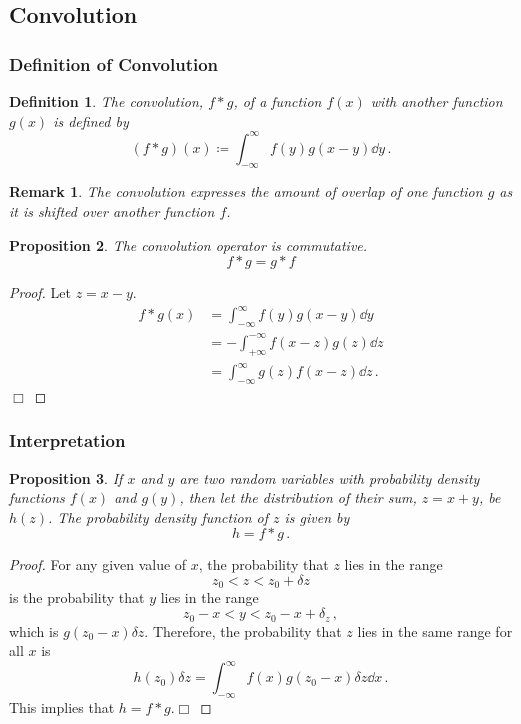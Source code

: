\documentclass{article}
\theoremstyle{plain}\theoremheaderfont{\normalfont\itshape}\theorembodyfont{\rmfamily}\theoremseparator{.}\newtheorem*{rem}{Remark}\newtheorem*{ex}{Example}\newtheorem*{proof}{Proof}\newtheorem*{altp}{Alternative proof}
\theoremstyle{plain}\theoremheaderfont{\normalfont\bfseries}\theorembodyfont{\rmfamily}\theoremseparator{.}\newtheorem{thm}{Theorem}[section]\newtheorem{lem}[thm]{Lemma}\newtheorem{prop}[thm]{Proposition}\newtheorem*{cor}{Corollary}\newtheorem{defn}[thm]{Definition}\newtheorem{clm}[thm]{Claim}\newtheorem{clminproof}{Claim}
\theoremstyle{break}\theoremheaderfont{\normalfont\itshape}\theorembodyfont{\rmfamily}\theoremseparator{.\medskip}\newtheorem*{proofskip}{Proof}\newtheorem*{exs}{Examples}\newtheorem*{rems}{Remarks}
\theoremstyle{break}\theoremheaderfont{\normalfont\bfseries}\theorembodyfont{\rmfamily}\theoremseparator{.\medskip}\newtheorem{lemskip}[thm]{Lemma}\newtheorem{defnskip}[thm]{Definition}\newtheorem{propskip}[thm]{Proposition}\newtheorem{thmskip}[thm]{Theorem}
\numberwithin{equation}{section}
\newcommand{\qed}{\hfill\ensuremath{\Box}}
\begin{document}
	\subsection{Convolution}
	\subsubsection{Definition of Convolution}
	\begin{defn}
		The \textit{convolution}, \(f*g\), of a function \(f(x)\) with another function \(g(x)\) is defined by
		\[(f*g)(x)\coloneqq\int_{-\infty}^{\infty}f(y)g(x-y)\dd{y}\,.\]
	\end{defn}
	\begin{rem}
		The convolution expresses the amount of overlap of one function \(g\) as it is shifted over another function \(f\).
	\end{rem}
	
	\begin{prop}
		The convolution operator is commutative.
		\[f*g=g*f\]
	\end{prop}
	\begin{proof}
		Let \(z=x-y\).
		\begin{align*}
			f*g(x)&=\int_{-\infty}^{\infty}f(y)g(x-y)\dd{y}\\
			&=-\int_{+\infty}^{-\infty}f(x-z)g(z)\dd{z}\\
			&=\int_{-\infty}^{\infty}g(z)f(x-z)\dd{z}\,.
		\end{align*}\qed
	\end{proof}
	
	\subsubsection{Interpretation}
	\begin{prop}
		If \(x\) and \(y\) are two random variables with probability density functions \(f(x)\) and \(g(y)\), then let the distribution of their sum, \(z=x+y\), be \(h(z)\). The probability density function of \(z\) is given by
		\[h=f*g\,.\]
	\end{prop}
	
	\begin{proof}
		For any given value of \(x\), the probability that \(z\) lies in the range
		\[z_0<z<z_0+\delta z\]
		is the probability that \(y\) lies in the range
		\[z_0-x<y<z_0-x+\delta_z\,,\]
		which is \(g(z_0-x)\delta z\). Therefore, the probability that \(z\) lies in the same range for all \(x\) is
		\[h(z_0)\delta z=\int_{-\infty}^{\infty}f(x)g(z_0-x)\delta z\dd{x}\,.\]
		This implies that \(h=f*g\).\qed
	\end{proof}
	
\end{document}
